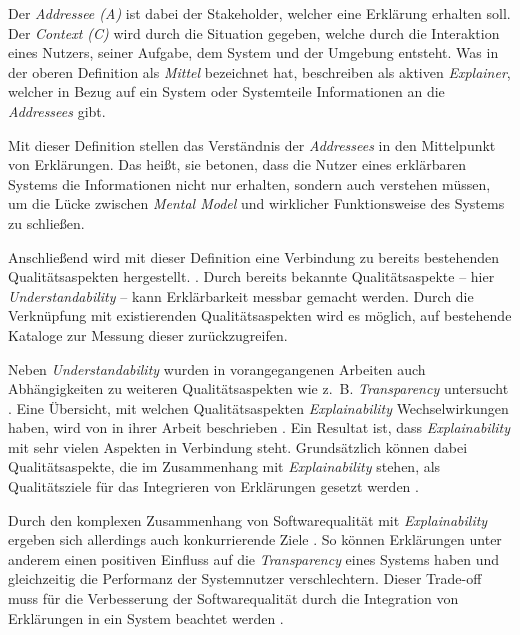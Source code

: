 \smallskip

Der \textit{Addressee (A)} ist dabei der Stakeholder, welcher eine Erklärung erhalten soll. Der \textit{Context (C)} wird durch die Situation gegeben, welche durch die Interaktion eines Nutzers, seiner Aufgabe, dem System und der Umgebung entsteht. Was \citeauthor{kohl_explainability_2019} in der oberen Definition als \textit{Mittel} bezeichnet hat, beschreiben \citeauthor{chazette_end-users_nodate} als aktiven \textit{Explainer}, welcher in Bezug auf ein 
System oder Systemteile Informationen an die \textit{Addressees} gibt.

Mit dieser Definition stellen \citeauthor{chazette_knowledge_nodate} das Verständnis der \textit{Addressees} in den Mittelpunkt von Erklärungen. Das heißt, sie betonen, dass die Nutzer eines erklärbaren Systems die Informationen nicht nur erhalten, sondern auch verstehen müssen, um die Lücke zwischen \textit{Mental Model} und wirklicher Funktionsweise des Systems zu schließen.

Anschließend wird mit dieser Definition eine Verbindung zu bereits bestehenden Qualitätsaspekten hergestellt. \cite{chazette_end-users_nodate}. Durch bereits bekannte Qualitätsaspekte – hier \textit{Understandability} – kann Erklärbarkeit messbar gemacht werden. Durch die Verknüpfung mit existierenden Qualitätsaspekten wird es möglich, auf bestehende Kataloge zur Messung dieser zurückzugreifen.

Neben \textit{Understandability} wurden in vorangegangenen Arbeiten auch Abhängigkeiten zu weiteren Qualitätsaspekten wie z.~B. \textit{Transparency} untersucht \cite{wang_integration_2020}. Eine Übersicht, mit welchen Qualitätsaspekten \textit{Explainability} Wechselwirkungen haben, wird von \citeauthor{chazette_knowledge_nodate} in ihrer Arbeit beschrieben \cite{chazette_knowledge_nodate}. Ein Resultat ist, dass \textit{Explainability} mit sehr vielen Aspekten in Verbindung steht. Grundsätzlich können dabei Qualitätsaspekte, die im Zusammenhang mit \textit{Explainability} stehen, als Qualitätsziele für das Integrieren von Erklärungen gesetzt werden \cite{wang_integration_2020}.

Durch den komplexen Zusammenhang von Softwarequalität mit \textit{Explainability} ergeben sich allerdings auch konkurrierende Ziele \cite{chazette_end-users_nodate}. So können Erklärungen unter anderem einen positiven Einfluss auf die \textit{Transparency} eines Systems haben und gleichzeitig die Performanz der Systemnutzer verschlechtern. Dieser Trade-off muss für die Verbesserung der Softwarequalität durch die Integration von Erklärungen in ein System beachtet werden \cite[vgl.][]{wang_integration_2020}.

